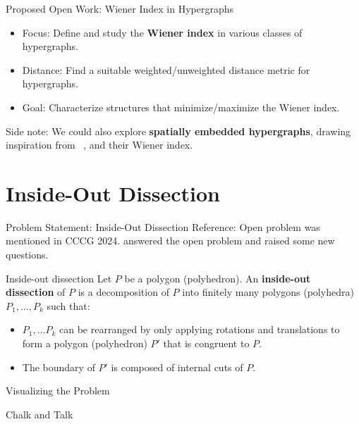 \documentclass[11pt]{beamer}
\begin{document}
\begin{frame}{Proposed Open Work: Wiener Index in Hypergraphs}
	\begin{itemize}
		\pause
		\item Focus: Define and study the \textbf{Wiener index} in various classes of hypergraphs.
		      \pause
		\item Distance: Find a suitable weighted/unweighted distance metric for hypergraphs.
		      \pause
		\item Goal: Characterize structures that minimize/maximize the Wiener index.
	\end{itemize}

	\pause
	Side note: We could also explore \textbf{spatially embedded hypergraphs}, drawing inspiration from ~\cite{article:geometric_spanning_trees_minimizing_wiener_index}, and their Wiener index.
\end{frame}

\section{Inside-Out Dissection}

\begin{frame}{Problem Statement: Inside-Out Dissection}
	Reference: Open problem was mentioned in CCCG 2024. \cite{article:inside_out_dissections_polygons_polyhedra} answered the open problem and raised some new questions.

	\pause
	\begin{block}{Inside-out dissection}
		Let $P$ be a polygon (polyhedron). An \textbf{inside-out dissection} of $P$ is a decomposition of $P$ into finitely many polygons (polyhedra) $P_1, \dots, P_k$ such that:
		\begin{itemize}
			\item $P_1, \dots P_k$ can be rearranged by only applying rotations and translations to form a polygon (polyhedron) $P'$ that is congruent to $P$.
			\item The boundary of $P'$ is composed of internal cuts of $P$.
		\end{itemize}
	\end{block}
\end{frame}

\begin{frame}{Visualizing the Problem}
	\pause
	\begin{center}
		Chalk and Talk
	\end{center}
\end{frame}
\end{document}

